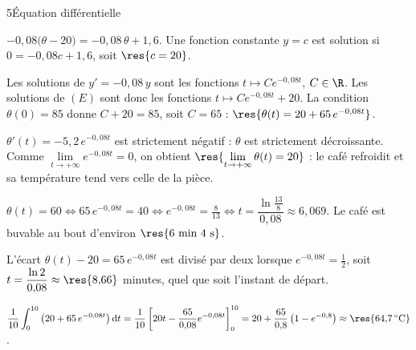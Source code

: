 \begin{corrigeBac}{5}{Équation différentielle}
\begin{questions}
  \item $-0{,}08\big(\theta-20\big)=-0{,}08\,\theta+1{,}6$. Une fonction constante $y=c$ est solution si $0=-0{,}08c+1{,}6$, soit
    $\res{c=20}$. 
  \item Les solutions de $y'=-0{,}08\,y$ sont les fonctions $t\mapsto Ce^{-0{,}08t}$, $C\in\R$. Les solutions de $(E)$ sont donc les
    fonctions $t\mapsto Ce^{-0{,}08t}+20$. La condition $\theta(0)=85$ donne $C+20=85$, soit $C=65$ :
    $\res{\theta(t)=20+65\,e^{-0{,}08t}}$. 
  \item $\theta'(t)=-5{,}2\,e^{-0{,}08t}$ est strictement négatif : $\theta$ est strictement décroissante. Comme
    $\lim\limits_{t\to+\infty}e^{-0{,}08t}=0$, on obtient $\res{\lim\limits_{t\to+\infty}\theta(t)=20}$ : le café refroidit et sa
    température tend vers celle de la pièce. 
  \item $\theta(t)=60\iff65\,e^{-0{,}08t}=40\iff e^{-0{,}08t}=\frac{8}{13}\iff t=\dfrac{\ln\frac{13}{8}}{0{,}08}\approx6{,}069$. Le café
    est buvable au bout d'environ $\res{6\text{ min }4\text{ s}}$. \pts{1 pt}
  \item L'écart $\theta(t)-20=65\,e^{-0{,}08t}$ est divisé par deux lorsque $e^{-0{,}08t}=\frac12$, soit $t=\dfrac{\ln2}{0{,}08}\approx\res{8{,}66}$
    minutes, quel que soit l'instant de départ. 
  \item $\dfrac1{10}\displaystyle\int_0^{10}\left(20+65\,e^{-0{,}08t}\right)\mathrm{d}t=\dfrac1{10}\left[20t-\dfrac{65}{0{,}08}e^{-0{,}08t}\right]_0^{10}
    =20+\dfrac{65}{0{,}8}\left(1-e^{-0{,}8}\right)\approx\res{64{,}7\,^\circ\text{C}}$. \pts{1 pt}
\end{questions}
\end{corrigeBac}

